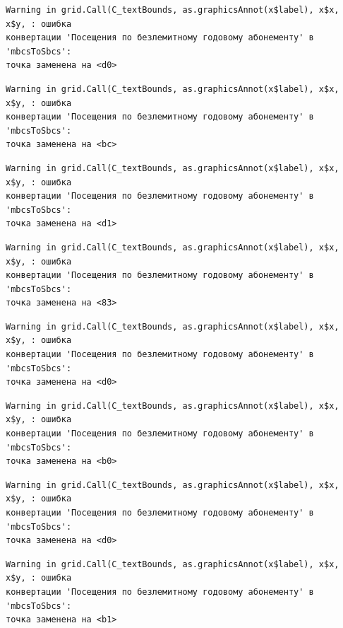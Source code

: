 \documentclass[
  letterpaper,
  DIV=11,
  numbers=noendperiod]{scrreprt}
\begin{document}
\begin{verbatim}
Warning in grid.Call(C_textBounds, as.graphicsAnnot(x$label), x$x, x$y, : ошибка
конвертации 'Посещения по безлемитному годовому абонементу' в 'mbcsToSbcs':
точка заменена на <d0>
\end{verbatim}

\begin{verbatim}
Warning in grid.Call(C_textBounds, as.graphicsAnnot(x$label), x$x, x$y, : ошибка
конвертации 'Посещения по безлемитному годовому абонементу' в 'mbcsToSbcs':
точка заменена на <bc>
\end{verbatim}

\begin{verbatim}
Warning in grid.Call(C_textBounds, as.graphicsAnnot(x$label), x$x, x$y, : ошибка
конвертации 'Посещения по безлемитному годовому абонементу' в 'mbcsToSbcs':
точка заменена на <d1>
\end{verbatim}

\begin{verbatim}
Warning in grid.Call(C_textBounds, as.graphicsAnnot(x$label), x$x, x$y, : ошибка
конвертации 'Посещения по безлемитному годовому абонементу' в 'mbcsToSbcs':
точка заменена на <83>
\end{verbatim}

\begin{verbatim}
Warning in grid.Call(C_textBounds, as.graphicsAnnot(x$label), x$x, x$y, : ошибка
конвертации 'Посещения по безлемитному годовому абонементу' в 'mbcsToSbcs':
точка заменена на <d0>
\end{verbatim}

\begin{verbatim}
Warning in grid.Call(C_textBounds, as.graphicsAnnot(x$label), x$x, x$y, : ошибка
конвертации 'Посещения по безлемитному годовому абонементу' в 'mbcsToSbcs':
точка заменена на <b0>
\end{verbatim}

\begin{verbatim}
Warning in grid.Call(C_textBounds, as.graphicsAnnot(x$label), x$x, x$y, : ошибка
конвертации 'Посещения по безлемитному годовому абонементу' в 'mbcsToSbcs':
точка заменена на <d0>
\end{verbatim}

\begin{verbatim}
Warning in grid.Call(C_textBounds, as.graphicsAnnot(x$label), x$x, x$y, : ошибка
конвертации 'Посещения по безлемитному годовому абонементу' в 'mbcsToSbcs':
точка заменена на <b1>
\end{verbatim}
\end{document}
